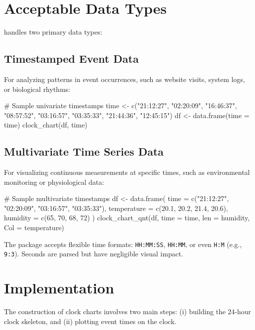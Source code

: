 \documentclass[article]{jss}
\begin{document}

\section{Acceptable Data Types} \label{sec:data}

 handles two primary data types:

\subsection{Timestamped Event Data}
For analyzing patterns in event occurrences, such as website visits, system logs, or biological rhythms:

\begin{Code}
# Sample univariate timestamps
time <- c("21:12:27", "02:20:09", "16:46:37", "08:57:52",
          "03:16:57", "03:35:33", "21:44:36", "12:45:15")
df <- data.frame(time = time)
clock_chart(df, time)
\end{Code}

\subsection{Multivariate Time Series Data}
For visualizing continuous measurements at specific times, such as environmental monitoring or physiological data:

\begin{Code}
# Sample multivariate timestamps
df <- data.frame(
  time = c("21:12:27", "02:20:09", "03:16:57", "03:35:33"),
  temperature = c(20.1, 20.2, 21.4, 20.6),
  humidity = c(65, 70, 68, 72)
)
clock_chart_qnt(df, time = time, len = humidity, Col = temperature)
\end{Code}

The package accepts flexible time formats: \texttt{HH:MM:SS}, \texttt{HH:MM}, or even \texttt{H:M} (e.g., \texttt{9:3}). Seconds are parsed but have negligible visual impact.



\section{Implementation} \label{sec:implementation}

The construction of clock charts involves two main steps: (i) building the 24-hour clock skeleton, and (ii) plotting event times on the clock.
\end{document}
